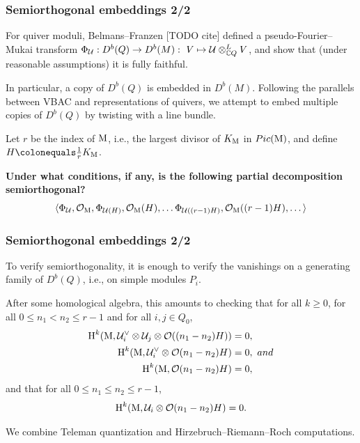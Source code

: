 \documentclass{beamer}
\begin{document}
\begin{frame}
    \frametitle{Semiorthogonal embeddings 2/2}
For quiver moduli, Belmans--Franzen [TODO cite]
defined a pseudo-Fourier--Mukai transform
$\Phi_{\mathcal{U}} : D^b(Q) \overset{}{\rightarrow} D^b(M) :~V \mapsto \mathcal{U} \otimes_{\mathbb{C} Q}^{L} V$,
and show that (under reasonable assumptions) it is fully faithful.

In particular, a copy of $D^b(Q)$ is embedded in $D^b(M)$. \pause
    Following the parallels between VBAC and representations of quivers,
we attempt to embed multiple copies of $D^b(Q)$ by twisting with a line bundle. \pause

Let $r$ be the index of $\operatorname{M}$, i.e.,
the largest divisor of $K_{\operatorname{M}}$ in $Pic(\operatorname{M})$, and
define $H \colonequals \frac{1}{r}K_{\modulispace}$. \pause

\textbf{Under what conditions, if any, is the following partial decomposition semiorthogonal?}
\[
    \langle
    \Phi_{\mathcal{U}}, \mathcal{O}_{\operatorname{M}},
    \Phi_{\mathcal{U}(H)}, \mathcal{O}_{\operatorname{M}}(H), \dots
    \Phi_{\mathcal{U}((r-1)H)}, \mathcal{O}_{\operatorname{M}}((r-1)H), \dots
    \rangle
\]
\end{frame}

\begin{frame}
    \frametitle{Semiorthogonal embeddings 2/2}

To verify semiorthogonality, it is enough to verify the vanishings
on a generating family of $D^b(Q)$, i.e., on simple modules $P_i$. \pause

After some homological algebra, this amounts to checking that for all $k \geq 0$,
for all $0 \leq n_1 < n_2 \leq r-1$ and for all $i,j \in Q_0$,
\begin{align}
    \operatorname{H}^k(\operatorname{M}, \mathcal{U}^\vee_i \otimes \mathcal{U}_j \otimes \mathcal{O}((n_1 - n_2)H)) &= 0, \label{equation:needed-UidualUjH}\\
    \operatorname{H}^k(\operatorname{M}, \mathcal{U}^\vee_i \otimes \mathcal{O}(n_1 - n_2)H) &= 0,\ and \label{equation:needed-UidualH}\\
    \operatorname{H}^k(\operatorname{M}, \mathcal{O}(n_1 - n_2)H) &= 0, \label{equation:needed-H}
\end{align}
and that for all $0 \leq n_1 \leq n_2 \leq r-1$,
\begin{equation}
    \operatorname{H}^k(\operatorname{M}, \mathcal{U}_i \otimes \mathcal{O}(n_1 - n_2)H) = 0. \label{equation:needed-UiH}
\end{equation} \pause

We combine Teleman quantization and Hirzebruch--Riemann--Roch computations.
\end{frame}
\end{document}
